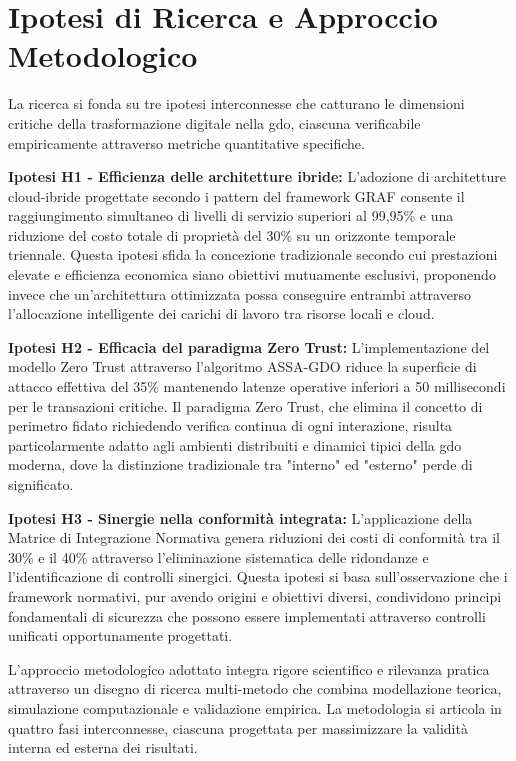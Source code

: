 \section{\texorpdfstring{Ipotesi di Ricerca e Approccio Metodologico}{1.4 - Ipotesi di Ricerca e Approccio Metodologico}}
\label{sec:ipotesi_metodologia}

La ricerca si fonda su tre ipotesi interconnesse che catturano le dimensioni critiche della trasformazione digitale nella \gls{gdo}, ciascuna verificabile empiricamente attraverso metriche quantitative specifiche.

\textbf{Ipotesi H1 - Efficienza delle architetture ibride:} L'adozione di architetture cloud-ibride progettate secondo i pattern del framework GRAF consente il raggiungimento simultaneo di livelli di servizio superiori al 99,95\% e una riduzione del costo totale di proprietà del 30\% su un orizzonte temporale triennale. Questa ipotesi sfida la concezione tradizionale secondo cui prestazioni elevate e efficienza economica siano obiettivi mutuamente esclusivi, proponendo invece che un'architettura ottimizzata possa conseguire entrambi attraverso l'allocazione intelligente dei carichi di lavoro tra risorse locali e cloud.

\textbf{Ipotesi H2 - Efficacia del paradigma Zero Trust:} L'implementazione del modello Zero Trust attraverso l'algoritmo ASSA-GDO riduce la superficie di attacco effettiva del 35\% mantenendo latenze operative inferiori a 50 millisecondi per le transazioni critiche. Il paradigma Zero Trust, che elimina il concetto di perimetro fidato richiedendo verifica continua di ogni interazione, risulta particolarmente adatto agli ambienti distribuiti e dinamici tipici della \gls{gdo} moderna, dove la distinzione tradizionale tra "interno" ed "esterno" perde di significato.

\textbf{Ipotesi H3 - Sinergie nella conformità integrata:} L'applicazione della Matrice di Integrazione Normativa genera riduzioni dei costi di conformità tra il 30\% e il 40\% attraverso l'eliminazione sistematica delle ridondanze e l'identificazione di controlli sinergici. Questa ipotesi si basa sull'osservazione che i framework normativi, pur avendo origini e obiettivi diversi, condividono principi fondamentali di sicurezza che possono essere implementati attraverso controlli unificati opportunamente progettati.

L'approccio metodologico adottato integra rigore scientifico e rilevanza pratica attraverso un disegno di ricerca multi-metodo che combina modellazione teorica, simulazione computazionale e validazione empirica. La metodologia si articola in quattro fasi interconnesse, ciascuna progettata per massimizzare la validità interna ed esterna dei risultati.

